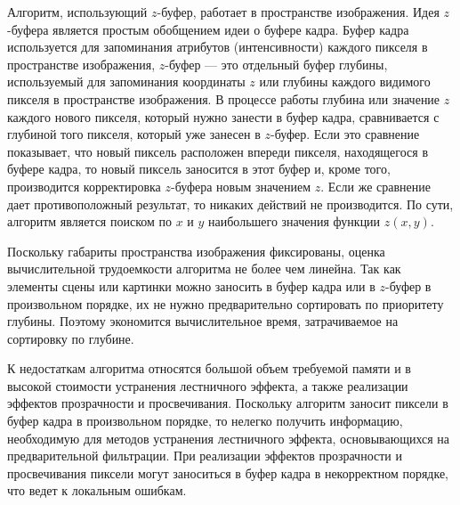 

Алгоритм, использующий $z$-буфер, работает в пространстве изображения. Идея $z$-буфера является простым обобщением идеи о буфере кадра. Буфер кадра используется для запоминания атрибутов (интенсивности) каждого пикселя в пространстве изображения, $z$-буфер --- это отдельный буфер глубины, используемый для запоминания координаты $z$ или глубины каждого видимого пикселя в пространстве изображения. В процессе работы глубина или значение $z$ каждого нового пикселя, который нужно занести в буфер кадра, сравнивается с глубиной того пикселя, который уже занесен в $z$-буфер. Если это сравнение показывает, что новый пиксель расположен впереди пикселя, находящегося в буфере кадра, то новый пиксель заносится в этот буфер и, кроме того, производится корректировка $z$-буфера новым значением $z$. Если же сравнение дает противоположный результат, то никаких действий не производится. По сути, алгоритм является поиском по $x$ и $y$ наибольшего значения функции $z(x, y)$.

Поскольку габариты пространства изображения фиксированы, оценка вычислительной трудоемкости алгоритма не более чем линейна. Так как элементы сцены или картинки можно заносить в буфер кадра или в $z$-буфер в произвольном порядке, их не нужно предварительно сортировать по приоритету глубины. Поэтому экономится вычислительное время, затрачиваемое на сортировку по глубине.

К недостаткам алгоритма относятся большой объем требуемой памяти и в высокой стоимости устранения лестничного эффекта, а также реализации эффектов прозрачности и просвечивания. Поскольку алгоритм заносит пиксели в буфер кадра в произвольном порядке, то нелегко получить информацию, необходимую для методов устранения лестничного эффекта, основывающихся на предварительной фильтрации. При реализации эффектов прозрачности и просвечивания пиксели могут заноситься в буфер кадра в некорректном порядке, что ведет к локальным ошибкам.~\cite{ZBuff}

